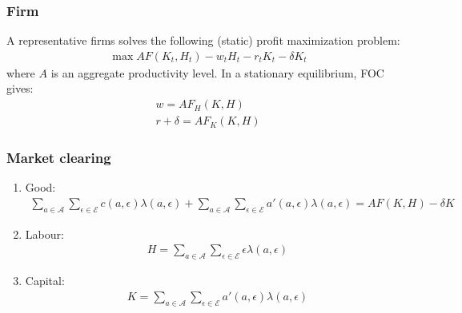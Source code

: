 \documentclass{beamer}
\begin{document}
\begin{frame}
\frametitle{Firm} 
A representative firms solves the following (static) profit maximization problem: 
\begin{equation}
\begin{aligned}
\max AF(K_t,H_t) - w_t H_t - r_t K_t - \delta K_t
\end{aligned}
\end{equation}
where $A$ is an aggregate productivity level. In a stationary equilibrium, FOC gives: 
\begin{equation}
\begin{aligned}
w = A F_H(K,H) \\ 
r + \delta = A F_K(K,H)
\end{aligned}
\end{equation}
\end{frame}





\begin{frame}
\frametitle{Market clearing}
\begin{enumerate}
	\item Good: 
\begin{equation}
\begin{aligned}
\sum_{a \in \mathcal{A}} 
\sum_{\epsilon \in \mathcal{E}}
c(a,\epsilon) \lambda(a,\epsilon)
+
\sum_{a \in \mathcal{A}} 
\sum_{\epsilon \in \mathcal{E}}
a'(a,\epsilon) \lambda(a,\epsilon)
= AF(K,H) - \delta K
\end{aligned}
\end{equation}
\item Labour: 
\begin{equation}
\begin{aligned}
H 
= 
\sum_{a \in \mathcal{A}} 
\sum_{\epsilon \in \mathcal{E}}
\epsilon \lambda(a,\epsilon)
\end{aligned}
\end{equation}
\item Capital: 
\begin{equation}
\begin{aligned}
K
=
\sum_{a \in \mathcal{A}} 
\sum_{\epsilon \in \mathcal{E}}
a'(a,\epsilon) \lambda(a,\epsilon)
\end{aligned}
\end{equation}
\end{enumerate}
\end{frame}
\end{document}
